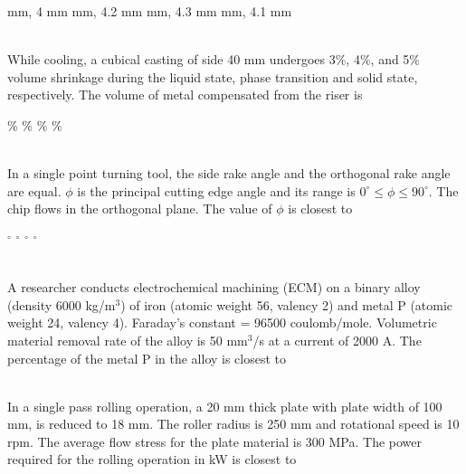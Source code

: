 \documentclass[addpoints,11pt]{exam}
\begin{document}
\begin{questions}
    \begin{oneparchoices}
         mm, 4 mm
         mm, 4.2 mm
         mm, 4.3 mm
         mm, 4.1 mm
    \end{oneparchoices}\\

    \question While cooling, a cubical casting of side 40 mm undergoes 3\%, 4\%, and 5\% volume shrinkage during the liquid state, phase transition and solid state, respectively. The volume of metal compensated from the riser is\\

    \begin{oneparchoices}
        \%
        \%
        \%
        \%
    \end{oneparchoices}\\

    \question In a single point turning tool, the side rake angle and the orthogonal rake angle are equal. $\phi$ is the principal cutting edge angle and its range is $0^\circ \le \phi \le 90^\circ$. The chip flows in the orthogonal plane. The value of $\phi$ is closest to\\

    \begin{oneparchoices}
        $^\circ$
        $^\circ$
        $^\circ$
        $^\circ$
    \end{oneparchoices}\\

    \question A researcher conducts electrochemical machining (ECM) on a binary alloy (density 6000 kg/m$^3$) of iron (atomic weight 56, valency 2) and metal P (atomic weight 24, valency 4). Faraday's constant = 96500 coulomb/mole. Volumetric material removal rate of the alloy is 50 mm$^3$/s at a current of 2000 A. The percentage of the metal P in the alloy is closest to\\

    \begin{oneparchoices}
    \end{oneparchoices}\\

    \question In a single pass rolling operation, a 20 mm thick plate with plate width of 100 mm, is reduced to 18 mm. The roller radius is 250 mm and rotational speed is 10 rpm. The average flow stress for the plate material is 300 MPa. The power required for the rolling operation in kW is closest to\\


\end{questions}
\end{document}
